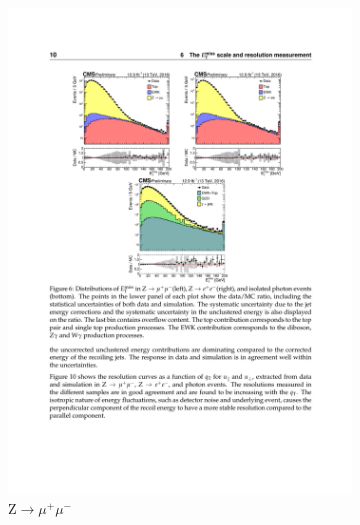 \begin{figure}[!htb]
\begin{subfigure}[t]{0.31\textwidth}
          \includegraphics[width=\textwidth]{figures/met_resolution_zmm.pdf}
          \caption{Z$\to \mu^+ \mu^-$}
          \label{fig:met_resolution_zmm}
        \end{subfigure}
        \quad
        \begin{subfigure}[t]{0.31\textwidth}

\end{subfigure}
\end{figure}
